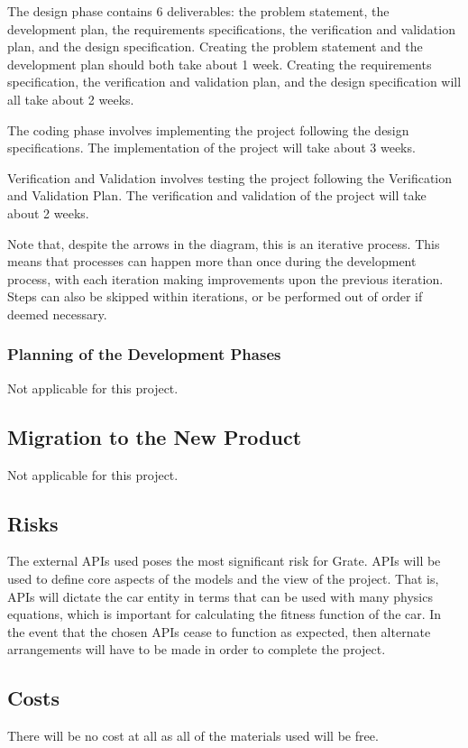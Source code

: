 \documentclass[12pt, titlepage]{article}
\begin{document}
The design phase contains 6 deliverables: the problem statement, the development 
plan, the requirements specifications, the verification and validation plan, and 
the design specification. Creating the problem statement and the development 
plan should both take about 1 week. Creating the requirements specification, the 
verification and validation plan, and the design specification will all take 
about 2 weeks.

The coding phase involves implementing the project following the design 
specifications. The implementation of the project will take about 3 weeks.

Verification and Validation involves testing the project following the 
Verification and Validation Plan. The verification and validation of the project 
will take about 2 weeks.

Note that, despite the arrows in the diagram, this is an iterative process. This 
means that processes can happen more than once during the development process, 
with each iteration making improvements upon the previous iteration. Steps can 
also be skipped within iterations, or be performed out of order if deemed 
necessary. 

\subsubsection{Planning of the Development Phases}
Not applicable for this project.

\subsection{Migration to the New Product}
Not applicable for this project.

\subsection{Risks}

The external APIs used poses the most significant risk for Grate. APIs will be 
used to define core aspects of the models and the view of the project. That is, 
APIs will dictate the car entity in terms that can be used with many physics 
equations, which is important for calculating the fitness function of the car. 
In the event that the chosen APIs cease to function as expected, then alternate 
arrangements will have to be made in order to complete the project. 

\subsection{Costs}
There will be no cost at all as all of the materials used will be free.
\end{document}
